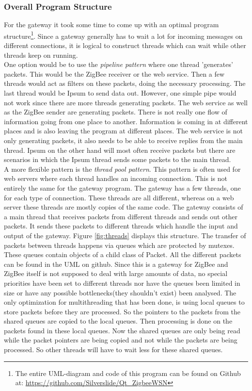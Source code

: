 \subsubsection{Overall Program Structure}
For the gateway it took some time to come up with an optimal program structure\footnote{The entire UML-diagram and code of this program can be found on Github at: \url{https://github.com/Silverslide/Qt_ZigbeeWSN}}. Since a gateway generally has to wait a lot for incoming messages on different connections, it is logical to construct threads which can wait while other threads keep on running.\\
One option would be to use the \textit{pipeline pattern} where one thread 'generates' packets. This would be the ZigBee receiver or the web service. Then a few threads would act as filters on these packets, doing the necessary processing. The last thread would be Ipsum to send data out. However, one simple pipe would not work since there are more threads generating packets. The web service as well as the ZigBee sender are generating packets. There is not really one flow of information going from one place to another. Information is coming in at different places and is also leaving the program at different places. The web service is not only generating packets, it also needs to be able to receive replies from the main thread. Ipsum on the other hand will most often receive packets but there are scenarios in which the Ipsum thread sends some packets to the main thread.\\ 
A more flexible pattern is the \textit{thread pool pattern}. This pattern is often used for web servers where each thread handles an incoming connection. This is not entirely the same for the gateway program. The gateway has a few threads, one for each type of connection. These threads are all different, whereas on a web server these threads are mostly copies of the same code. The gateway consists of a main thread that receives packets from different threads and sends out other packets. It sends these packets to different threads which handle the input and output of the gateway. Figure \ref{fig:threads} displays this structure. The transfer of packets between threads happens via queues which are protected by mutexes. These queues contain objects of a child class of Packet. All the different packets can be found in the UML on github. Since this is a gateway for ZigBee and ZigBee itself is not supposed to deal with large amounts of data, no special priorities have been set to different threads nor have the queues been limited in size or have any possible bottlenecks(they shouldn't exist) been analysed. The only optimization for multithreading that has been done, is using local queues to store packets before they are processed. So the pointers to the packets from the shared queues are copied to the local queues. Then processing is done on the packets found in these local queues. Now the shared queues are only being read while the packet pointers are being copied and not while the packets are being processed. So other threads will have to wait less for these shared queues.\\
